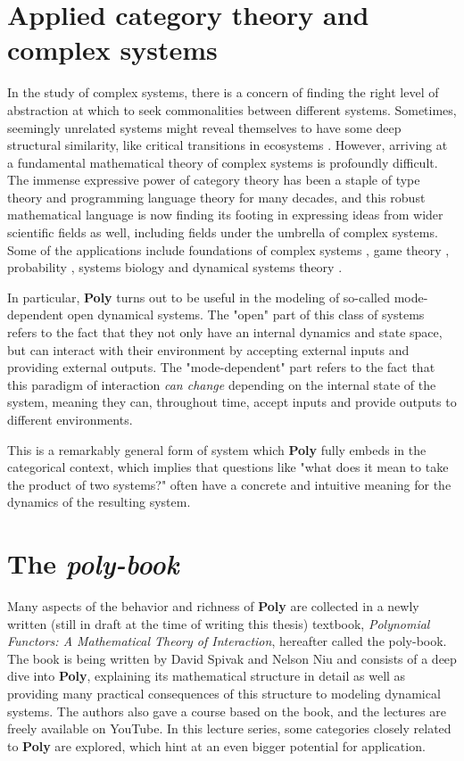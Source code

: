 \section{Applied category theory and complex systems}
In the study of complex systems, there is a concern of finding the right level of abstraction at which to seek commonalities between different systems. Sometimes, seemingly unrelated systems might reveal themselves to have some deep structural similarity, like critical transitions in ecosystems \cite{catastrophic}. However, arriving at a fundamental mathematical theory of complex systems is profoundly difficult. The immense expressive power of category theory has been a staple of type theory and programming language theory for many decades, and this robust mathematical language is now finding its footing in expressing ideas from wider scientific fields as well, including fields under the umbrella of complex systems. Some of the applications include foundations of complex systems \cite{complexcatsadjunction}, game theory \cite{compositional-gt}, probability \cite{markov-categories}, systems biology \cite{compositional-react-net} and dynamical systems theory \cite{operad-dynsys}.

In particular, \textbf{Poly} turns out to be useful in the modeling of so-called mode-dependent open dynamical systems. The "open" part of this class of systems refers to the fact that they not only have an internal dynamics and state space, but can interact with their environment by accepting external inputs and providing external outputs. The "mode-dependent" part refers to the fact that this paradigm of interaction \textit{can change} depending on the internal state of the system, meaning they can, throughout time, accept inputs and provide outputs to different environments.

This is a remarkably general form of system which \textbf{Poly} fully embeds in the categorical context, which implies that questions like "what does it mean to take the product of two systems?" often have a concrete and intuitive meaning for the dynamics of the resulting system.

\section{The \textit{poly-book}}
Many aspects of the behavior and richness of \textbf{Poly} are collected in a newly written (still in draft at the time of writing this thesis) textbook, \textit{Polynomial Functors: A Mathematical Theory of Interaction}, hereafter called the poly-book. The book is being written by David Spivak and Nelson Niu and consists of a deep dive into \textbf{Poly}, explaining its mathematical structure in detail as well as providing many practical consequences of this structure to modeling dynamical systems. The authors also gave a course based on the book, and the lectures are freely available on YouTube. In this lecture series, some categories closely related to \textbf{Poly} are explored, which hint at an even bigger potential for application.


